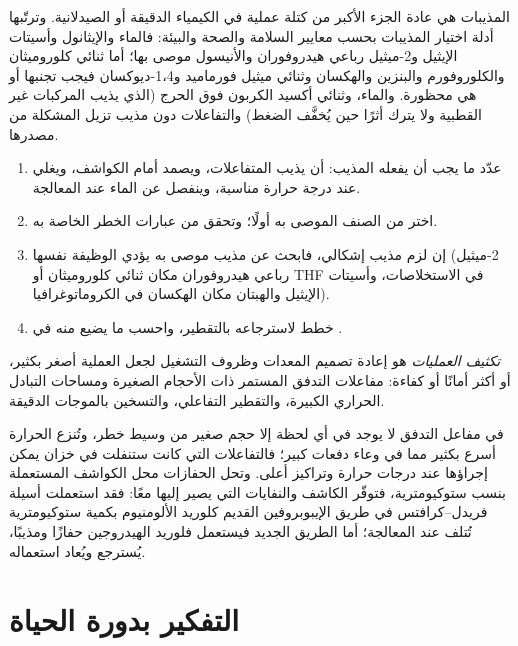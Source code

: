 المذيبات هي عادة الجزء الأكبر من كتلة عملية في الكيمياء الدقيقة أو
الصيدلانية. وترتّبها أدلة اختيار المذيبات بحسب معايير السلامة والصحة
والبيئة: فالماء والإيثانول وأسيتات الإيثيل و2-ميثيل رباعي هيدروفوران
والأنيسول موصى بها؛ أما ثنائي كلوروميثان والكلوروفورم والبنزين والهكسان
وثنائي ميثيل فورماميد و1،4-ديوكسان فيجب تجنبها أو هي محظورة. والماء،
وثنائي أكسيد الكربون فوق الحرج (الذي يذيب المركبات غير القطبية ولا يترك
أثرًا حين يُخفَّف الضغط) والتفاعلات دون مذيب تزيل
المشكلة من مصدرها.

\begin{method}\label{met:b3:green-industrial:solvent-choice}
\begin{enumerate}
  \item عدّد ما يجب أن يفعله المذيب: أن يذيب المتفاعلات، ويصمد أمام الكواشف،
        ويغلي عند درجة حرارة مناسبة، وينفصل عن الماء عند المعالجة.
  \item اختر من الصنف الموصى به أولًا؛ وتحقق من عبارات الخطر الخاصة به.
  \item إن لزم مذيب إشكالي، فابحث عن مذيب موصى به يؤدي
        الوظيفة نفسها (2-ميثيل رباعي هيدروفوران مكان ثنائي كلوروميثان أو THF في
        الاستخلاصات، وأسيتات الإيثيل والهبتان مكان الهكسان في الكروماتوغرافيا).
  \item خطط لاسترجاعه بالتقطير، واحسب ما يضيع منه في .
\end{enumerate}
\end{method}

\begin{definition}\label{def:b3:green-industrial:intensification}
\emph{تكثيف العمليات} هو
إعادة تصميم المعدات وظروف التشغيل لجعل العملية أصغر بكثير، أو
أكثر أمانًا أو كفاءة: مفاعلات التدفق المستمر ذات الأحجام الصغيرة
ومساحات التبادل الحراري الكبيرة، والتقطير التفاعلي، والتسخين بالموجات الدقيقة.
\end{definition}

في مفاعل التدفق لا يوجد في أي لحظة إلا حجم صغير من وسيط
خطر، وتُنزع الحرارة أسرع بكثير مما في وعاء دفعات كبير؛ فالتفاعلات
التي كانت ستنفلت في خزان يمكن إجراؤها عند درجات حرارة وتراكيز
أعلى. وتحل الحفازات محل الكواشف المستعملة بنسب ستوكيومترية، فتوفّر
الكاشف والنفايات التي يصير إليها معًا: فقد استعملت أسيلة فريدل--كرافتس في طريق
الإيبوبروفين القديم كلوريد الألومنيوم بكمية ستوكيومترية تُتلف عند
المعالجة؛ أما الطريق الجديد فيستعمل فلوريد الهيدروجين حفازًا ومذيبًا،
يُسترجع ويُعاد استعماله.

\section{التفكير بدورة الحياة}

